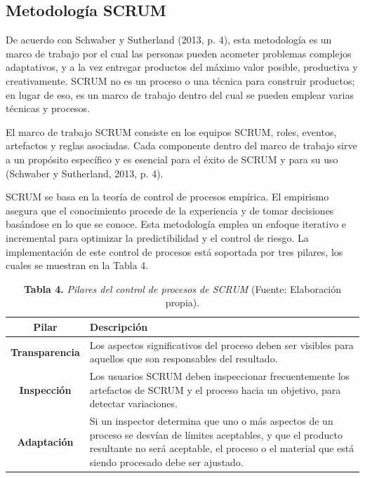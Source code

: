 		\subsection{Metodolog\'{i}a SCRUM}
De acuerdo con Schwaber y Sutherland (2013, p. 4), esta metodolog\'{i}a es un marco de trabajo por el cual las personas pueden acometer problemas complejos adaptativos, y a la vez entregar productos del m\'{a}ximo valor posible, productiva y creativamente. SCRUM no es un proceso o una t\'{e}cnica para construir productos; en lugar de eso, es un marco de trabajo dentro del cual se pueden emplear varias t\'{e}cnicas y procesos. 
			
		\newpage			
			
El marco de trabajo SCRUM consiste en los equipos SCRUM, roles, eventos, artefactos y reglas asociadas. Cada componente dentro del marco de trabajo sirve a un prop\'{o}sito espec\'{i}fico y es esencial para el \'{e}xito de SCRUM y para su uso (Schwaber y Sutherland, 2013, p. 4).

SCRUM se basa en la teor\'{i}a de control de procesos emp\'{i}rica. El empirismo asegura 	que el conocimiento procede de la experiencia y de tomar decisiones bas\'{a}ndose en lo que se conoce. Esta metodolog\'{i}a emplea un enfoque iterativo e incremental para optimizar la predictibilidad y el control de riesgo. La implementaci\'{o}n de este control de procesos est\'{a} soportada por tres pilares, los cuales se muestran en la Tabla 4.
			
			\begin{table}[htb]
				\small
				\centering
				\setlength{\extrarowheight}{5pt}
				\begin{tabulary}{15cm}{|c|L|}
					\hline
					\textbf{Pilar} & \textbf{Descripci\'{o}n}\\ \hline
					\textbf{Transparencia} & Los aspectos significativos del proceso deben ser visibles para aquellos que son responsables del resultado.\\ \hline
					\textbf{Inspecci\'{o}n} & Los usuarios SCRUM deben inspeccionar frecuentemente los artefactos de SCRUM y el proceso hacia un objetivo, para detectar variaciones.\\ \hline
					\textbf{Adaptaci\'{o}n} & Si un inspector determina que uno o m\'{a}s aspectos de un proceso se desv\'{i}an de l\'{i}mites aceptables, y que el producto resultante no ser\'{a} aceptable, el proceso o el material que est\'{a} siendo procesado debe ser ajustado.\\ \hline
			\end{tabulary}
			\caption{\textbf{Tabla 4.} \textit{Pilares del control de procesos de SCRUM} (Fuente: Elaboraci\'{o}n propia).}
			\end{table}
			\newpage
			
